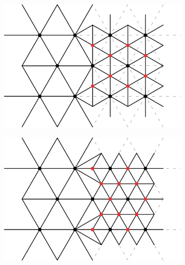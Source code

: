 \begin{figure}[!ht]
	\centering
	\begin{subfigure}[b]{0.2\linewidth}
		\centering
		\includegraphics[width=\linewidth,valign=m]{images/starAdaptivity-cgf2016/remeshing-sqrt3.png}
		\caption{\label{fig:remeshing-sqrt3}}
	\end{subfigure}
	\hfill
	\begin{subfigure}[b]{0.2\linewidth}
		\centering
		\includegraphics[width=\linewidth,valign=m]{images/starAdaptivity-cgf2016/remeshing-bisect.png}
		\caption{\label{fig:remeshing-bisect}}
	\end{subfigure}
	\hfill
	\begin{subfigure}[b]{0.2\linewidth}
		\centering

\end{subfigure}
\end{figure}
